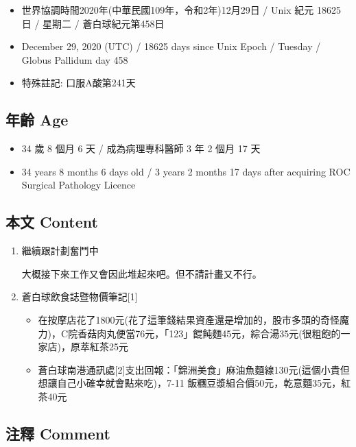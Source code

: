 \documentclass[a5paper, 11pt
]{book}
\providecommand{\tightlist}{%
  \setlength{\itemsep}{0pt}\setlength{\parskip}{0pt}}
\begin{document}
\begin{itemize}
\tightlist
\item
  世界協調時間2020年(中華民國109年，令和2年)12月29日 / Unix 紀元 18625
  日 / 星期二 / 蒼白球紀元第458日
\item
  December 29, 2020 (UTC) / 18625 days since Unix Epoch / Tuesday /
  Globus Pallidum day 458
\item
  特殊註記: 口服A酸第241天
\end{itemize}

\hypertarget{ux5e74ux9f61-age-28}{%
\subsection{年齡 Age}\label{ux5e74ux9f61-age-28}}

\begin{itemize}
\tightlist
\item
  34 歲 8 個月 6 天 / 成為病理專科醫師 3 年 2 個月 17 天
\item
  34 years 8 months 6 days old / 3 years 2 months 17 days after
  acquiring ROC Surgical Pathology Licence
\end{itemize}

\hypertarget{ux672cux6587-content-28}{%
\subsection{本文 Content}\label{ux672cux6587-content-28}}

\begin{enumerate}
\def\labelenumi{\arabic{enumi}.}
\item
  繼續跟計劃奮鬥中

  大概接下來工作又會因此堆起來吧。但不請計畫又不行。
\item
  蒼白球飲食誌暨物價筆記{[}1{]}

  \begin{itemize}
  \tightlist
  \item
    在按摩店花了1800元(花了這筆錢結果資產還是增加的，股市多頭的奇怪魔力)，C院香菇肉丸便當76元，「123」餛飩麵45元，綜合湯35元(很粗飽的一家店)，原萃紅茶25元
  \item
    蒼白球南港通訊處{[}2{]}支出回報：「錦洲美食」麻油魚麵線130元(這個小貴但想讓自己小確幸就會點來吃)，7-11
    飯糰豆漿組合價50元，乾意麵35元，紅茶40元
  \end{itemize}
\end{enumerate}

\hypertarget{ux6ce8ux91cb-comment-28}{%
\subsection{注釋 Comment}\label{ux6ce8ux91cb-comment-28}}
\end{document}
